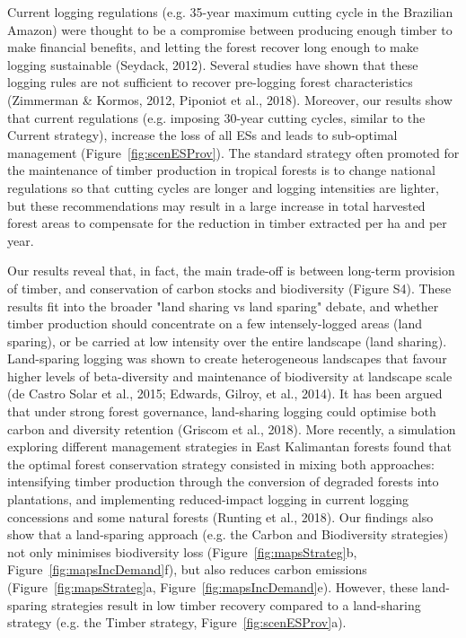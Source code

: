 \documentclass{article}
\begin{document}
Current logging regulations (e.g. 35-year maximum cutting cycle in the Brazilian Amazon) were thought to be a compromise between producing enough timber to make financial benefits, and letting the forest recover long enough to make logging sustainable (Seydack, 2012). Several studies have shown that these logging rules are not sufficient to recover pre-logging forest characteristics (Zimmerman & Kormos, 2012, Piponiot et al., 2018). Moreover, our results show that current regulations (e.g. imposing 30-year cutting cycles, similar to the Current strategy), increase the loss of all ESs and leads to sub-optimal management (Figure~\ref{fig:scenESProv}). The standard strategy often promoted for the maintenance of timber production in tropical forests is to change national regulations so that cutting cycles are longer and logging intensities are lighter, but these recommendations may result in a large increase in total harvested forest areas to compensate for the reduction in timber extracted per ha and per year.

Our results reveal that, in fact, the main trade-off is between long-term provision of timber, and conservation of carbon stocks and biodiversity (Figure S4). These results fit into the broader "land sharing vs land sparing" debate, and whether timber production should concentrate on a few intensely-logged areas (land sparing), or be carried at low intensity over the entire landscape (land sharing). Land-sparing logging was shown to create heterogeneous landscapes that favour higher levels of beta-diversity and maintenance of biodiversity at landscape scale (de Castro Solar et al., 2015; Edwards, Gilroy, et al., 2014). It has been argued that under strong forest governance, land-sharing logging could optimise both carbon and diversity retention (Griscom et al., 2018). More recently, a simulation exploring different management strategies in East Kalimantan forests found that the optimal forest conservation strategy consisted in mixing both approaches: intensifying timber production through the conversion of degraded forests into plantations, and implementing reduced-impact logging in current logging concessions and some natural forests (Runting et al., 2018). Our findings also show that a land-sparing approach (e.g. the Carbon and Biodiversity strategies) not only minimises biodiversity loss (Figure~\ref{fig:mapsStrateg}b, Figure~\ref{fig:mapsIncDemand}f), but also reduces carbon emissions (Figure~\ref{fig:mapsStrateg}a, Figure~\ref{fig:mapsIncDemand}e). However, these land-sparing strategies result in low timber recovery compared to a land-sharing strategy (e.g. the Timber strategy, Figure~\ref{fig:scenESProv}a).
\end{document}
